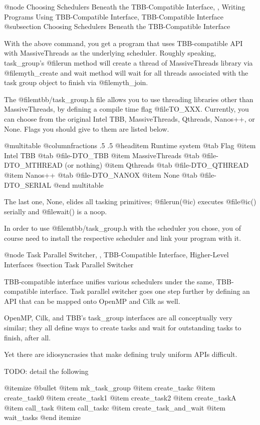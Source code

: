 @node Choosing Schedulers Beneath the TBB-Compatible Interface,  , Writing Programs Using TBB-Compatible Interface, TBB-Compatible Interface
@subsection Choosing Schedulers Beneath the TBB-Compatible Interface

With the above command, you get a program that uses TBB-compatible API
with MassiveThreads as the underlying scheduler.  Roughly speaking,
task_group's @file{run} method will create a thread of MassiveThreads
library via @file{myth_create} and wait method will wait for all threads
associated with the task group object to finish via @file{myth_join}.

The @file{mtbb/task_group.h} file allows you to use threading libraries other than MassiveThreads, by defining a compile time flag @file{TO_XXX}.  Currently, you can choose from the original Intel TBB, MassiveThreads, Qthreads, Nanos++, or None.  Flags you should give to them are listed below.

@multitable @columnfractions .5 .5
@headitem Runtime system @tab Flag 
@item Intel TBB      @tab @file{-DTO_TBB}
@item MassiveThreads @tab @file{-DTO_MTHREAD} (or nothing)
@item Qthreads       @tab @file{-DTO_QTHREAD}
@item Nanos++        @tab @file{-DTO_NANOX}
@item None           @tab @file{-DTO_SERIAL}
@end multitable

The last one, None, elides all tasking primitives; @file{run(@i{c})} executes @file{@i{c}()} serially and @file{wait()} is a noop.  

In order to use @file{mtbb/task_group.h} with the scheduler you chose, you of course need to install the respective scheduler and link your program with it.  

@node Task Parallel Switcher,  , TBB-Compatible Interface, Higher-Level Interfaces
@section  Task Parallel Switcher

TBB-compatible interface unifies various schedulers under the same,
TBB-compatible interface.  Task parallel switcher goes one step further 
by defining an API that can be mapped onto OpenMP and Cilk as well.

OpenMP, Cilk, and TBB's task_group interfaces are all conceptually very
similar; they all define ways to create tasks and wait for outstanding
tasks to finish, after all.

Yet there are idiosyncrasies that make defining truly uniform APIs
difficult.  

TODO: detail the following

@itemize @bullet
@item mk_task_group
@item create_taskc
@item create_task0
@item create_task1
@item create_task2
@item create_taskA
@item call_task
@item call_taskc
@item create_task_and_wait
@item wait_tasks
@end itemize

